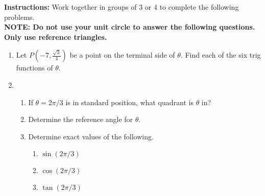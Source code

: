 



\noindent \textbf{Instructions:}  Work together in groups of  3 or 4 to complete the following problems.\\
\noindent \textbf{NOTE:  Do not use your unit circle to answer the following questions.  Only use reference triangles.}

\begin{enumerate}

\item Let $P(-7,\frac{\sqrt{3}}{4})$ be a point on the terminal side of $\theta$.  Find each of the six trig functions of $\theta$.\begin{enumerate}
\end{enumerate}
\vfill

\item
\begin{enumerate}

\item  If $\theta=2\pi/3$ is in standard position, what quadrant is $\theta$ in? \\[.5in]

\item Determine the reference angle for $\theta$. \\[.5in]

\item Determine exact values of the following.

\begin{enumerate}
\item $\sin(2\pi/3)$ \\[.3in]
\item $\cos(2\pi/3)$ \\[.3in]
\item $\tan(2\pi/3)$ \\[.3in]
\end{enumerate}


\end{enumerate}
\end{enumerate}
